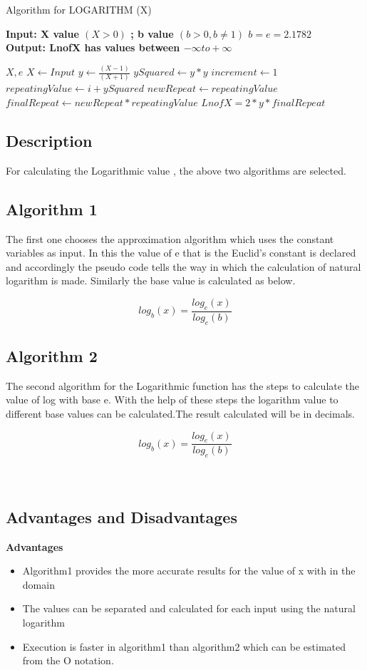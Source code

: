 \documentclass[12pt]{report}
\begin{document}
\begin{algorithm}
\caption{Algorithm for LOGARITHM (X)}
\textbf{Input: X value $(X > 0)$   ; b value $(b>0, b \neq 1)$  $b=e=2.1782$}\\
\textbf{Output: LnofX has values between $-\infty to + \infty$ }
\begin{algorithmic}[1]
${X,e}$
\State $X \gets Input $
\State $y \gets \frac{(X-1)}{(X+1)}$
\State $ySquared \gets y*y$
\State $increment \gets 1$
        \State $repeatingValue \gets i+ySquared$
        \State $newRepeat \gets repeatingValue$
        \State $finalRepeat \gets newRepeat * repeatingValue$
        \State $LnofX = 2 * y * finalRepeat$
      \EndFor

\EndProcedure
\end{algorithmic}
\end{algorithm}

\pagebreak

\subsection{Description}
For calculating the Logarithmic value , the above two algorithms are selected. 
\subsection{Algorithm 1}
The first one chooses the approximation algorithm which  uses the constant variables as input. In this the value of e that is the Euclid's constant is declared and accordingly the pseudo code tells the way in which the calculation of natural logarithm is made. Similarly the base value is calculated as below. 

$$ log_b(x) = \frac{log_e(x)}{log_e(b)}$$

\subsection{Algorithm 2}
The second algorithm for the Logarithmic function has the steps to  calculate the value of log with base e. With the help of these steps the logarithm value to different base values can be calculated.The result calculated will be in decimals. 

$$ log_b(x) = \frac{log_e(x)}{log_e(b)}$$
\\\\

\subsection{Advantages and Disadvantages}
\textbf{Advantages}
\begin{itemize}
   \item Algorithm1 provides the more accurate results for the value of x with in the domain
   \item The values can be separated and calculated for each input using the natural logarithm 
   \item Execution is faster in algorithm1 than algorithm2 which can be estimated from the O notation.
\end{itemize}
\end{document}
